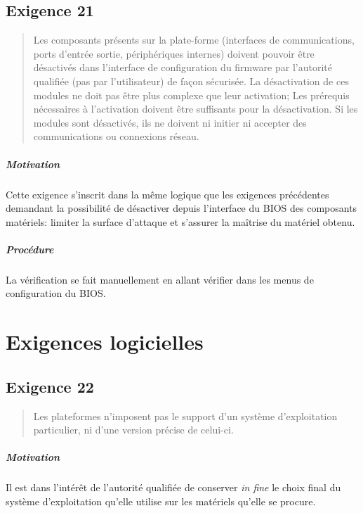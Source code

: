 \documentclass{report}
\begin{document}
\section{Exigence 21}

\begin{quote}
  Les composants présents sur la plate-forme (interfaces de communications,
  ports d’entrée sortie, périphériques internes) doivent pouvoir être désactivés
  dans l’interface de configuration du firmware par l’autorité qualifiée (pas
  par l’utilisateur) de façon sécurisée.
  La désactivation de ces modules ne doit pas être plus complexe que leur
  activation; Les prérequis nécessaires à l’activation doivent être suffisants
  pour la désactivation.
  Si les modules sont désactivés, ils ne doivent ni initier ni accepter des
  communications ou connexions réseau.
\end{quote}

\paragraph{Motivation}
%
Cette exigence s’inscrit dans la même logique que les exigences précédentes
demandant la possibilité de désactiver depuis l’interface du BIOS des composants
matériels: limiter la surface d’attaque et s’assurer la maîtrise du matériel
obtenu.

\paragraph{Procédure}
%
La vérification se fait manuellement en allant vérifier dans les menus de
configuration du BIOS.


\chapter{Exigences logicielles}

\section{Exigence 22}

\begin{quote}
  Les plateformes n’imposent pas le support d’un système d’exploitation
  particulier, ni d’une version précise de celui-ci.
\end{quote}

\paragraph{Motivation}
%
Il est dans l’intérêt de l’autorité qualifiée de conserver \emph{in fine} le
choix final du système d’exploitation qu’elle utilise sur les matériels qu’elle
se procure.
\end{document}
